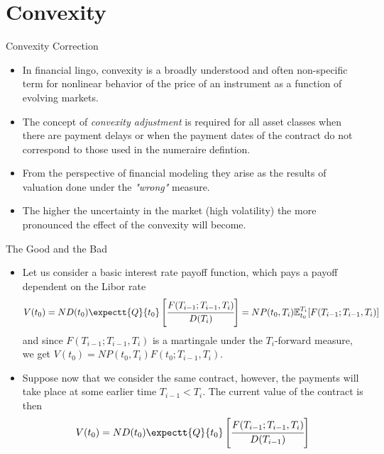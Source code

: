 \documentclass{beamer}
\begin{document}
\section{Convexity}
\begin{frame}{Convexity Correction}
\begin{itemize}
\item 	In financial lingo, convexity is a broadly understood and often non-specific term for nonlinear behavior of the price of an instrument as a function of evolving markets.
\item The concept of \emph{convexity adjustment} is required for all asset classes when there are payment delays or when the payment dates of the contract do
not correspond to those used in the numeraire defintion. %
\item From the perspective of financial modeling they arise as the results of valuation done under the \emph{"wrong"} measure.
\item The higher the uncertainty in the market (high volatility) the more pronounced the effect of the convexity will become.
\end{itemize}
\end{frame}

\begin{frame}{The Good and the Bad}
\begin{itemize}
\item Let us consider a basic interest rate payoff function, which pays a payoff dependent on the Libor rate
\begin{equation*}
V(t_0) = N D(t_0)\expectt{Q}{t_0}\left[\cfrac{F(T_{i-1};T_{i-1},T_i)}{D(T_i)}\right]=
	NP(t_0,T_i)\mathbb{E}^{T_i}_{t_0}[F(T_{i-1};T_{i-1},T_i)]
\end{equation*}
and since $F(T_{i-1};T_{i-1}, T_i)$ is a martingale under the $T_i$-forward measure, we get $V(t_0)=NP(t_0,T_i)F(t_0;T_{i-1}, T_i)$.
\item Suppose now that we consider the same contract, however, the payments will take place at some earlier time $T_{i-1} < T_i$. The current value of the contract is then
\begin{equation*}
	V(t_0) = N D(t_0)\expectt{Q}{t_0}\left[\cfrac{F(T_{i-1};T_{i-1},T_i)}{D(T_{i-1})}\right]
\end{equation*}
\end{itemize}
\end{frame}
\end{document}
